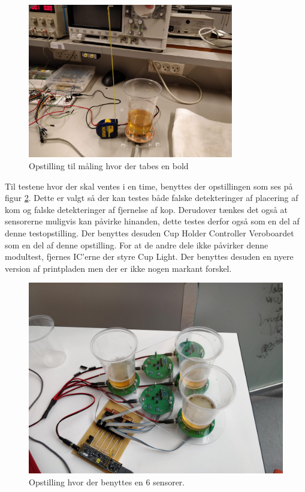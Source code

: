 \documentclass[Modultest/Modultest_main.tex]{subfiles}
\begin{document}
\begin{figure}[H]
    \centering
    \includegraphics[width=0.8\textwidth]{Modultest/CupSensor/testOpstilling/testBallDrop.jpg}
    \caption{Opstilling til måling hvor der tabes en bold}
    \label{fig:testBallDrop}
\end{figure}

Til testene hvor der skal ventes i en time, benyttes der opstillingen som ses på figur \ref{fig:testMoreSensors}. Dette er valgt så der kan testes både falske detekteringer af placering af kom og falske detekteringer af fjernelse af kop. Derudover tænkes det også at sensorerne muligvis kan påvirke hinanden, dette testes derfor også som en del af denne testopstilling. Der benyttes desuden Cup Holder Controller Veroboardet som en del af denne opstilling. For at de andre dele ikke påvirker denne modultest, fjernes IC'erne der styre Cup Light. Der benyttes desuden en nyere version af printpladen men der er ikke nogen markant forskel.
\begin{figure}[H]
    \centering
    \includegraphics[width=1\textwidth]{Modultest/CupSensor/testOpstilling/testMoreSensors.jpg}
    \caption{Opstilling hvor der benyttes en 6 sensorer.}
    \label{fig:testMoreSensors}
\end{figure}
\end{document}
